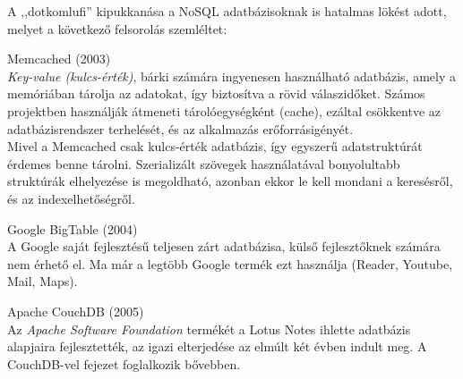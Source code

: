 A ,,dotkomlufi'' kipukkanása a NoSQL adatbázisoknak is hatalmas lökést adott, melyet a következő felsorolás szemléltet:
\begin{description}
	\item{Memcached (2003)} \hfill \\
		\emph{Key-value (kulcs-érték)}, bárki számára ingyenesen használható adatbázis, amely a memóriában tárolja az adatokat, így biztosítva a rövid válaszidőket. Számos projektben használják átmeneti tárolóegységként (cache), ezáltal csökkentve az adatbázisrendszer terhelését, és az alkalmazás erőforrásigényét.\\
		Mivel a Memcached csak kulcs-érték adatbázis, így egyszerű adatstruktúrát érdemes benne tárolni. Szerializált szövegek használatával bonyolultabb struktúrák elhelyezése is megoldható, azonban ekkor le kell mondani a keresésről, és az indexelhetőségről.
	\item{Google BigTable (2004)} \hfill \\
		A Google saját fejlesztésű teljesen zárt adatbázisa, külső fejlesztőknek számára nem érhető el. Ma már a legtöbb Google termék ezt használja (Reader, Youtube, Mail, Maps).
	\item{Apache CouchDB (2005)} \hfill \\
		Az \emph{Apache Software Foundation} termékét a Lotus Notes ihlette adatbázis alapjaira fejlesztették, az igazi elterjedése az elmúlt két évben indult meg. A CouchDB-vel  fejezet foglalkozik bővebben.
\end{description}
	

